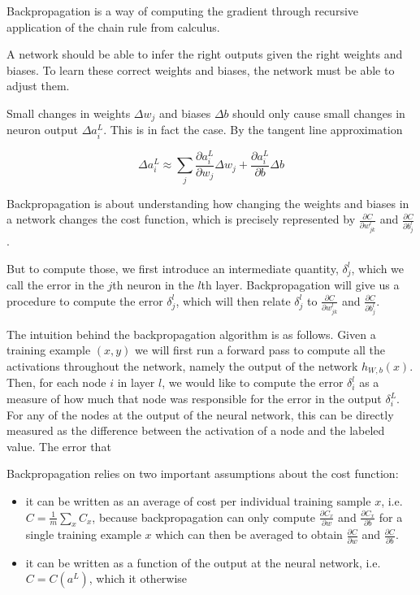 Backpropagation is a way of computing the gradient through recursive application of the chain rule from calculus.

A network should be able to infer the right outputs given the right weights and biases. To learn these correct weights and biases, the network must be able to adjust them.

Small changes in weights $\Delta w_j$ and biases $\Delta b$ should only cause small changes in neuron output $\Delta a^L_i$. This is in fact the case. By the tangent line approximation

$$
\Delta a^L_i \approx \sum_j \frac{\partial a^L_i}{\partial w_j} \Delta w_j + \frac{\partial a^L_i}{\partial b} \Delta b
$$

Backpropagation is about understanding how changing the weights and biases in a network changes the cost function, which is precisely represented by $\frac{\partial C}{\partial w^l_{jk}}$ and $\frac{\partial C}{\partial b^l_j}$.

But to compute those, we first introduce an intermediate quantity, $\delta^l_j$, which we call the error in the $j$th neuron in the $l$th layer. Backpropagation will give us a procedure to compute the error $\delta^l_j$, which will then relate $\delta^l_j$ to $\frac{\partial C}{\partial w^l_{jk}}$ and $\frac{\partial C}{\partial b^l_j}$.



The intuition behind the backpropagation algorithm is as follows. Given a training example $(x, y)$ we will first run a forward pass to compute all the activations throughout the network, namely the output of the network $h_{W,b}(x)$. Then, for each node $i$ in layer $l$, we would like to compute the error $\delta^{l}_i$ as a measure of how much that node was responsible for the error in the output $\delta^{L}_i$. For any of the nodes at the output of the neural network, this can be directly measured as the difference between the activation of a node and the labeled value.
The error that

Backpropagation relies on two important assumptions about the cost function:

\begin{itemize}
    \item it can be written as an average of cost per individual training sample $x$, i.e. $C = \frac{1}{m} \sum_x C_x$, because backpropagation can only compute $\frac{\partial C_x}{\partial w}$  and $\frac{\partial C_x}{\partial b}$ for a single training example $x$ which can then be averaged to obtain $\frac{\partial C}{\partial w}$  and $\frac{\partial C}{\partial b}$.
    \item it can be written as a function of the output at the neural network, i.e. $C = C(a^{L})$, which it otherwise
\end{itemize}

